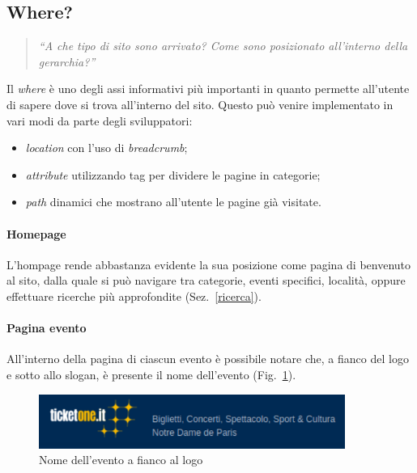 \subsection{Where?}
	\begin{quote}
		\emph{``A che tipo di sito sono arrivato? Come sono posizionato all'interno della gerarchia?''}
	\end{quote}
	Il \textit{where} è uno degli assi informativi più importanti in quanto permette all'utente di sapere dove si trova all'interno del sito.
	Questo può venire implementato in vari modi da parte degli sviluppatori:
	\begin{itemize}[noitemsep]
		\item \textit{location} con l'uso di \textit{breadcrumb};
		\item \textit{attribute} utilizzando tag per dividere le pagine in categorie;
		\item \textit{path} dinamici che mostrano all'utente le pagine già visitate.
	\end{itemize}
	
	\paragraph{Homepage}
		L'hompage rende abbastanza evidente la sua posizione come pagina di benvenuto al sito, dalla quale si può navigare tra categorie, eventi specifici, località, oppure effettuare ricerche più approfondite (Sez.~\ref{ricerca}).

	\paragraph{Pagina evento}
		All'interno della pagina di ciascun evento è possibile notare che, a fianco del logo e sotto allo slogan, è presente il nome dell'evento (Fig.~\ref{where}).
		
		\begin{figure}[hbt]
			\centering
			\includegraphics[width=10cm]{img/where.png}
			\caption{Nome dell'evento a fianco al logo}
			\label{where}
		\end{figure}
	
